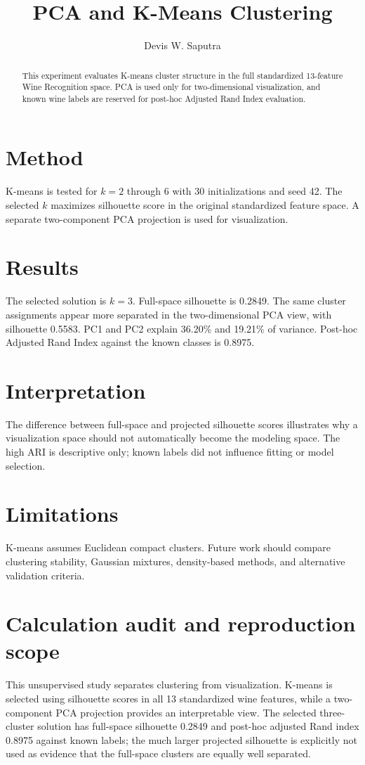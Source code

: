 \documentclass[11pt]{article}
\title{PCA and K-Means Clustering}
\author{Devis W. Saputra}
\begin{document}
\maketitle

\begin{abstract}
This experiment evaluates K-means cluster structure in the full standardized 13-feature Wine Recognition space. PCA is used only for two-dimensional visualization, and known wine labels are reserved for post-hoc Adjusted Rand Index evaluation.
\end{abstract}

\section{Method}
K-means is tested for $k=2$ through $6$ with 30 initializations and seed 42. The selected $k$ maximizes silhouette score in the original standardized feature space. A separate two-component PCA projection is used for visualization.

\section{Results}
The selected solution is $k=3$. Full-space silhouette is 0.2849. The same cluster assignments appear more separated in the two-dimensional PCA view, with silhouette 0.5583. PC1 and PC2 explain 36.20\% and 19.21\% of variance. Post-hoc Adjusted Rand Index against the known classes is 0.8975.

\section{Interpretation}
The difference between full-space and projected silhouette scores illustrates why a visualization space should not automatically become the modeling space. The high ARI is descriptive only; known labels did not influence fitting or model selection.

\section{Limitations}
K-means assumes Euclidean compact clusters. Future work should compare clustering stability, Gaussian mixtures, density-based methods, and alternative validation criteria.

\section{Calculation audit and reproduction scope}
This unsupervised study separates clustering from visualization. K-means is selected using silhouette scores in all 13 standardized wine features, while a two-component PCA projection provides an interpretable view. The selected three-cluster solution has full-space silhouette 0.2849 and post-hoc adjusted Rand index 0.8975 against known labels; the much larger projected silhouette is explicitly not used as evidence that the full-space clusters are equally well separated.
\end{document}
